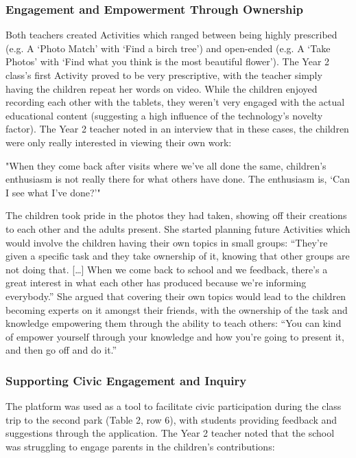 \subsubsection{Engagement and Empowerment Through Ownership}

Both teachers created Activities which ranged between being highly prescribed (e.g. A ‘Photo Match’ with ‘Find a birch tree’) and open-ended (e.g. A ‘Take Photos’ with ‘Find what you think is the most beautiful flower’). The Year 2 class’s first Activity proved to be very prescriptive, with the teacher simply having the children repeat her words on video. While the children enjoyed recording each other with the tablets, they weren’t very engaged with the actual educational content (suggesting a high influence of the technology’s novelty factor). The Year 2 teacher noted in an interview that in these cases, the children were only really interested in viewing their own work: 

\begin{displayquote}
"When they come back after visits where we've all done the same, children's enthusiasm is not really there for what others have done. The enthusiasm is, `Can I see what I’ve done?'"
\end{displayquote}

The children took pride in the photos they had taken, showing off their creations to each other and the adults present. She started planning future Activities which would involve the children having their own topics in small groups: “They’re given a specific task and they take ownership of it, knowing that other groups are not doing that. […] When we come back to school and we feedback, there’s a great interest in what each other has produced because we’re informing everybody.” She argued that covering their own topics would lead to the children becoming experts on it amongst their friends, with the ownership of the task and knowledge empowering them through the ability to teach others: “You can kind of empower yourself through your knowledge and how you’re going to present it, and then go off and do it.”

\subsubsection{Supporting Civic Engagement and Inquiry}

The platform was used as a tool to facilitate civic participation during the class trip to the second park (Table 2, row 6), with students providing feedback and suggestions through the application. The Year 2 teacher noted that the school was struggling to engage parents in the children’s contributions: 

